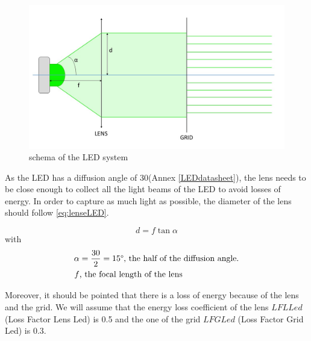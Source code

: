 \begin{figure}[h]
  \centerline{\includegraphics[scale=0.4]{fig/LEDsystem.jpg}}
  \caption{schema of the LED system}
  \label{fig:LEDsystem}
\end{figure}

As the LED has a diffusion angle of 30\textdegree (Annex \ref{LEDdatasheet}), the lens needs to be close enough to collect all the light beams of the LED to avoid losses of energy. In order to capture as much light as possible, the diameter of the lens should follow \eqref{eq:lenseLED}.

\begin{equation}
\label{eq:lenseLED}
d = f \tan \alpha
\end{equation}
with 
\begin{align*}
\alpha & = \frac{30}{2} = 15\mbox{\textdegree, the half of the diffusion angle.}\\
f & \mbox{, the focal length of the lens}
\end{align*}

Moreover, it should be pointed that there is a loss of energy because of the lens and the grid. We will assume that the energy loss coefficient of the lens $LFLLed$ (Loss Factor Lens Led) is 0.5 and the one of the grid $LFGLed$ (Loss Factor Grid Led) is 0.3.

